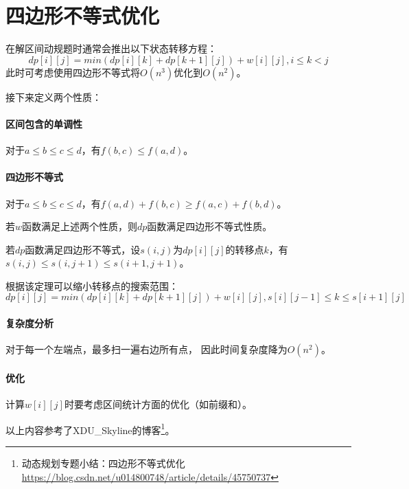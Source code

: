 \section{四边形不等式优化}\label{Quad}
在解区间动规题时通常会推出以下状态转移方程：
\begin{displaymath}
    dp[i][j]=min(dp[i][k]+dp[k+1][j])+w[i][j],i\leq k <j
\end{displaymath}
此时可考虑使用四边形不等式将$O(n^3)$优化到$O(n^2)$。

接下来定义两个性质：
\paragraph{区间包含的单调性}
对于$a\leq b\leq c\leq d$，有$f(b,c)\leq f(a,d)$。
\paragraph{四边形不等式}
对于$a\leq b\leq c\leq d$，有$f(a,d)+f(b,c)\geq f(a,c)+f(b,d)$。

\begin{theorem}
    若$w$函数满足上述两个性质，则$dp$函数满足四边形不等式性质。
\end{theorem}

\begin{theorem}
    若$dp$函数满足四边形不等式，设$s(i,j)$为$dp[i][j]$的转移点$k$，有
    $s(i,j)\leq s(i,j+1)\leq s(i+1,j+1)$。
\end{theorem}

根据该定理可以缩小转移点的搜索范围：
\begin{displaymath}
    dp[i][j]=min(dp[i][k]+dp[k+1][j])+w[i][j],s[i][j-1]\leq k \leq s[i+1][j]
\end{displaymath}

\paragraph{复杂度分析} 对于每一个左端点，最多扫一遍右边所有点，
因此时间复杂度降为$O(n^2)$。

\paragraph{优化} 计算$w[i][j]$时要考虑区间统计方面的优化（如前缀和）。

以上内容参考了XDU\_Skyline的博客\footnote{动态规划专题小结：四边形不等式优化
    \url{https://blog.csdn.net/u014800748/article/details/45750737}
}。
